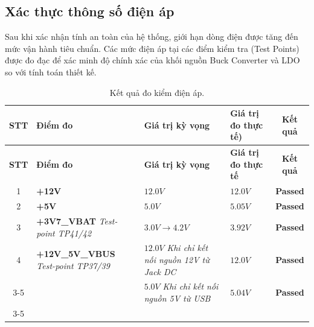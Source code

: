     \subsection{Xác thực thông số điện áp}
        Sau khi xác nhận tính an toàn của hệ thống, giới hạn dòng điện được tăng đến mức vận hành tiêu chuẩn. Các mức điện áp tại các điểm kiểm tra (Test Points) được đo đạc để xác minh độ chính xác của khối nguồn Buck Converter và LDO so với tính toán thiết kế.

        \begin{longtable}{|c|p{5cm}|p{4.5cm}|p{2.5cm}|c|}
            \caption{Kết quả đo kiểm điện áp.}
            \label{tab:voltage_validation_final} \\
            \hline
            \textbf{STT} & \textbf{Điểm đo} & \textbf{Giá trị kỳ vọng} & \textbf{Giá trị đo thực tế)} & \textbf{Kết quả} \\ \hline
            \endfirsthead
            \hline
            \textbf{STT} & \textbf{Điểm đo} & \textbf{Giá trị kỳ vọng} & \textbf{Giá trị đo thực tế} & \textbf{Kết quả} \\ \hline
            \endhead
            \hline
            \endfoot
            \endlastfoot

            1 & \textbf{+12V} & $12.0 V$ & $12.0 V$ & \textcolor{modern_blue}{\textbf{Passed}} \\ \hline

            2 & \textbf{+5V} & $5.0 V$ & $5.05 V$ & \textcolor{modern_blue}{\textbf{Passed}} \\ \hline
            
            3 & \textbf{+3V7\_VBAT} \newline \textit{Test-point TP41/42} & $3.0 V \rightarrow 4.2 V$ & $3.92 V$ & \textcolor{modern_blue}{\textbf{Passed}} \\ \hline
            
            4 & \textbf{+12V\_5V\_VBUS} \newline \textit{Test-point TP37/39} & $12.0 V$ \newline \textit{Khi chỉ kết nối nguồn 12V từ Jack DC} & $12.0 V$ & \textcolor{modern_blue}{\textbf{Passed}} \\ \cline{3-5}
            
              &  &  $5.0 V$ \newline \textit{Khi chỉ kết nối nguồn 5V từ USB} & $5.04 V$ & \textcolor{modern_blue}{\textbf{Passed}} \\ \cline{3-5}
            

\end{longtable}
